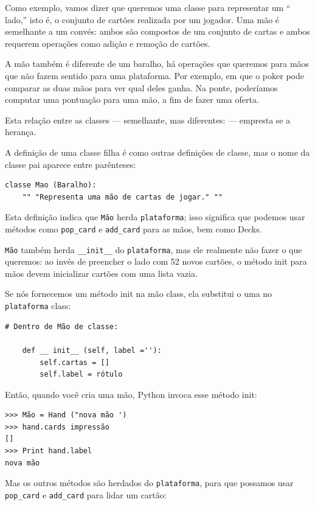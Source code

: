 \documentclass[10pt]{book}
\begin{document}
\begin{v erbatim}
Como exemplo, vamos dizer que queremos uma classe para representar um `` lado,''
isto é, o conjunto de cartões realizada por um jogador. Uma mão é semelhante a um
convés: ambos são compostos de um conjunto de cartas e ambos requerem operações
como adição e remoção de cartões.

A mão também é diferente de um baralho, há operações que queremos para
mãos que não fazem sentido para uma plataforma. Por exemplo, em que o poker
pode comparar as duas mãos para ver qual deles ganha. Na ponte, poderíamos
computar uma pontuação para uma mão, a fim de fazer uma oferta.

Esta relação entre as classes --- semelhante, mas diferentes: --- empresta
se a herança.  

A definição de uma classe filha é como outras definições de classe,
mas o nome da classe pai aparece entre parênteses:

\begin{verbatim}
classe Mao (Baralho):
    "" "Representa uma mão de cartas de jogar." ""
\end{verbatim}
%
Esta definição indica que {\tt Mão} herda {\tt plataforma};
isso significa que podemos usar métodos como \verb "pop_card" e \verb "add_card"
para as mãos, bem como Decks.

{\tt Mão} também herda \verb "__init__" do {\tt plataforma}, mas
ele realmente não fazer o que queremos: ao invés de preencher o lado
com 52 novos cartões, o método init para mãos devem inicializar
{cartões \tt} com uma lista vazia.

Se nós fornecemos um método init na mão {\tt} class, ela substitui o
uma no {\tt plataforma} class:

\begin{verbatim}
# Dentro de Mão de classe:

    def __ init__ (self, label =''):
        self.cartas = []
        self.label = rótulo
\end{verbatim}
%
Então, quando você cria uma mão, Python invoca esse método init:

\begin{verbatim}
>>> Mão = Hand ("nova mão ')
>>> hand.cards impressão
[]
>>> Print hand.label
nova mão
\end{verbatim}
%
Mas os outros métodos são herdados do {\tt plataforma}, para que possamos usar
\Verb "pop_card" e \verb "add_card" para lidar um cartão:


\end{v erbatim}
\end{document}
